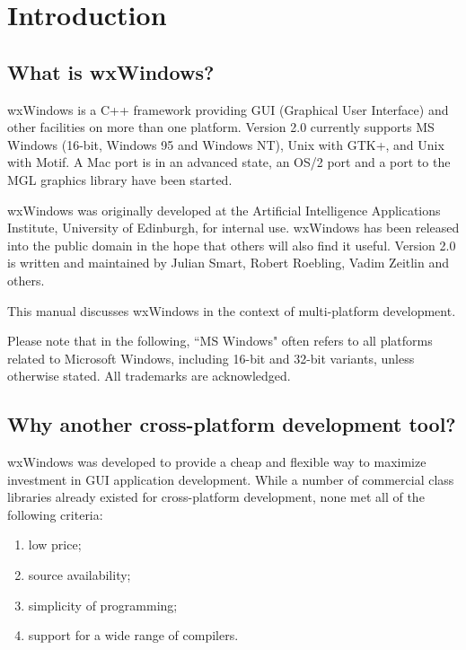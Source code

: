 \chapter{Introduction}\label{introduction}
%
%
\setfooter{\thepage}{}{}{}{}{\thepage}%

\section{What is wxWindows?}

wxWindows is a C++ framework providing GUI (Graphical User
Interface) and other facilities on more than one platform.  Version 2.0 currently
supports MS Windows (16-bit, Windows 95 and Windows NT), Unix with GTK+, and Unix with Motif.
A Mac port is in an advanced state, an OS/2 port and a port to the MGL graphics library
have been started.

wxWindows was originally developed at the Artificial Intelligence
Applications Institute, University of Edinburgh, for internal use.
wxWindows has been released into the public domain in the hope
that others will also find it useful. Version 2.0 is written and
maintained by Julian Smart, Robert Roebling, Vadim Zeitlin and others.

This manual discusses wxWindows in the context of multi-platform
development.

Please note that in the following, ``MS Windows" often refers to all
platforms related to Microsoft Windows, including 16-bit and 32-bit
variants, unless otherwise stated. All trademarks are acknowledged.

\section{Why another cross-platform development tool?}

wxWindows was developed to provide a cheap and flexible way to maximize
investment in GUI application development.  While a number of commercial
class libraries already existed for cross-platform development,
none met all of the following criteria:

\begin{enumerate}\itemsep=0pt
\item low price;
\item source availability;
\item simplicity of programming;
\item support for a wide range of compilers.
\end{enumerate}

